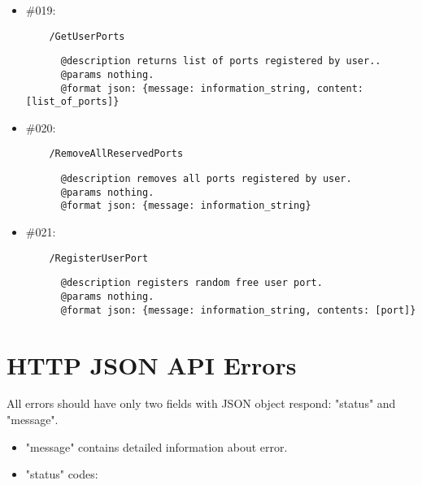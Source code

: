 \documentclass[11pt,a4paper]{scrartcl}
\begin{document}
\begin{itemize}
    \item \#019:
      \begin{verbatim}
    /GetUserPorts
      \end{verbatim}
      \begin{verbatim}
      @description returns list of ports registered by user..
      @params nothing.
      @format json: {message: information_string, content: [list_of_ports]}
      \end{verbatim}

    \item \#020:
      \begin{verbatim}
    /RemoveAllReservedPorts
      \end{verbatim}
      \begin{verbatim}
      @description removes all ports registered by user.
      @params nothing.
      @format json: {message: information_string}
      \end{verbatim}

    \item \#021:
      \begin{verbatim}
    /RegisterUserPort
      \end{verbatim}
      \begin{verbatim}
      @description registers random free user port.
      @params nothing.
      @format json: {message: information_string, contents: [port]}
      \end{verbatim}


  \end{itemize}


\section{HTTP JSON API Errors}\label{sec:apierrors}
  All errors should have only two fields with JSON object respond: "status" and "message".

  \begin{itemize}
    \item "message" contains detailed information about error.
    \item "status" codes:

  \end{itemize}
\end{document}
